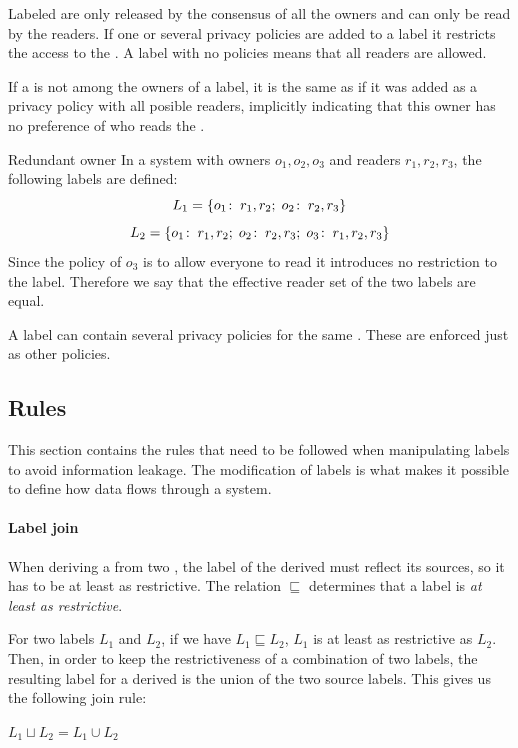 Labeled \xvalues{} are only released by the consensus of all the owners and can only be read by the readers.
If one or several privacy policies are added to a label it restricts the access to the \xvalue{}.
A label with no policies  means that all readers are allowed.

If a \principal{} is not among the owners of a label, it is the same as if it was added as a privacy policy with all posible readers, implicitly indicating that this owner has no preference of who reads the \xvalue{}.

\begin{example}{Redundant owner}
In a system with owners $o_1, o_2, o_3$ and readers $r_1, r_2, r_3$, the following labels are defined:
$$L_1 = \{o_1\!:\;r_1,r_2;\; o_2\!:\;r_2, r_3\}$$
$$L_2 = \{o_1\!:\;r_1,r_2;\; o_2\!:\;r_2, r_3;\; o_3\!:\;r_1, r_2, r_3\}$$
Since the policy of $o_3$ is to allow everyone to read it introduces no restriction to the label.
Therefore we say that the effective reader set of the two labels are equal.
\end{example}

A label can contain several privacy policies for the same \principal{}.
These are enforced just as other policies.

\subsection{Rules}
This section contains the rules that need to be followed when manipulating labels to avoid information leakage.
The modification of labels is what makes it possible to define how data flows through a system.

\paragraph{Label join}
When deriving a \xvalue{} from two \xvalues{}, the label of the derived \xvalue{} must reflect its sources, so it has to be at least as restrictive.
The relation $\sqsubseteq$ determines that a label is \textit{at least as restrictive}.
\begin{definition}
  For two labels $L_1$ and $L_2$, if we have $L_1 \sqsubseteq L_2$, $L_1$ is at least as restrictive as $L_2$.
  Then, in order to keep the restrictiveness of a combination of two labels, the resulting label for a derived \xvalue{} is the union of the two source labels.
  This gives us the following join rule:
  \begin{center}
    $L_1 \sqcup L_2 = L_1 \cup L_2$
  \end{center}
\end{definition}

